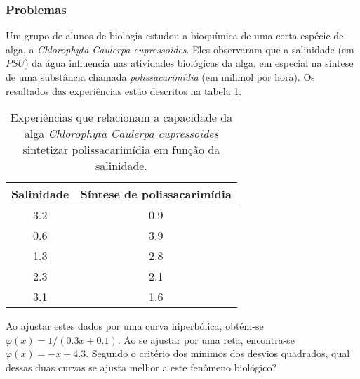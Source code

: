 \subsubsection{Problemas}
\begin{ex}
Um grupo de alunos de biologia estudou a bioquímica de uma certa espécie de alga, a \emph{Chlorophyta Caulerpa cupressoides}. Eles observaram que a salinidade (em $PSU$) da água influencia nas atividades biológicas da alga, em especial na síntese de uma substância chamada \emph{polissacarimídia} (em milimol por hora). Os resultados das experiências estão descritos na tabela \ref{alga}.

\begin{table}[htb]
\centering
\caption{Experiências que relacionam a capacidade da alga \emph{Chlorophyta Caulerpa cupressoides} sintetizar polissacarimídia em função da salinidade.}
\label{alga}
\begin{tabular}{@{}cc@{}}
\toprule
Salinidade & Síntese de polissacarimídia \\ \midrule
3.2        & 0.9                         \\
0.6        & 3.9                         \\
1.3        & 2.8                         \\
2.3        & 2.1                         \\
3.1        & 1.6                         \\ \bottomrule
\end{tabular}
\end{table}
Ao ajustar estes dados por uma curva hiperbólica, obtém-se $\varphi(x)=1/(0.3x+0.1)$. Ao se ajustar por uma reta, encontra-se $\varphi(x)=-x+4.3$. Segundo o critério dos mínimos dos desvios quadrados, qual dessas duas curvas se ajusta melhor a este fenômeno biológico? 
\end{ex}



%
%